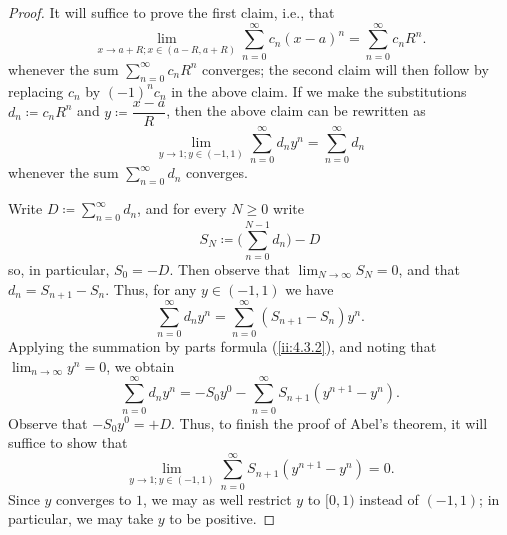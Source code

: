 \begin{proof}
  It will suffice to prove the first claim, i.e., that
  \[
    \lim_{x \to a + R ; x \in (a - R, a + R)} \sum_{n = 0}^\infty c_n (x - a)^n = \sum_{n = 0}^\infty c_n R^n.
  \]
  whenever the sum \(\sum_{n = 0}^\infty c_n R^n\) converges;
  the second claim will then follow by replacing \(c_n\) by \((-1)^n c_n\) in the above claim.
  If we make the substitutions \(d_n \coloneqq c_n R^n\) and \(y \coloneqq \dfrac{x - a}{R}\), then the above claim can be rewritten as
  \[
    \lim_{y \to 1 ; y \in (-1, 1)} \sum_{n = 0}^\infty d_n y^n = \sum_{n = 0}^\infty d_n
  \]
  whenever the sum \(\sum_{n = 0}^\infty d_n\) converges.

  Write \(D \coloneqq \sum_{n = 0}^\infty d_n\), and for every \(N \geq 0\) write
  \[
    S_N \coloneqq \bigg(\sum_{n = 0}^{N - 1} d_n\bigg) - D
  \]
  so, in particular, \(S_0 = -D\).
  Then observe that \(\lim_{N \to \infty} S_N = 0\), and that \(d_n = S_{n + 1} - S_n\).
  Thus, for any \(y \in (-1, 1)\) we have
  \[
    \sum_{n = 0}^\infty d_n y^n = \sum_{n = 0}^\infty (S_{n + 1} - S_n) y^n.
  \]
  Applying the summation by parts formula (\cref{ii:4.3.2}), and noting that \(\lim_{n \to \infty} y^n = 0\), we obtain
  \[
    \sum_{n = 0}^\infty d_n y^n = - S_0 y^0 - \sum_{n = 0}^\infty S_{n + 1} (y^{n + 1} - y^n).
  \]
  Observe that \(- S_0 y^0 = +D\).
  Thus, to finish the proof of Abel's theorem,
  it will suffice to show that
  \[
    \lim_{y \to 1 ; y \in (-1, 1)} \sum_{n = 0}^\infty S_{n + 1} (y^{n + 1} - y^n) = 0.
  \]
  Since \(y\) converges to \(1\), we may as well restrict \(y\) to \([0, 1)\) instead of \((-1, 1)\);
  in particular, we may take \(y\) to be positive.


\end{proof}
